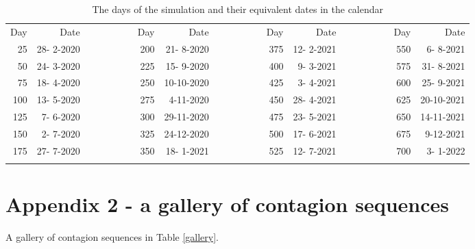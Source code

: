 \documentclass[graybox]{svmult}
\begin{document}
\begin{table}[t]
\begin{center}
\begin{footnotesize}
\begin{tabular}{rrrrrrrrrrr}
\hline\noalign{\smallskip}
 Day & Date &~~~~~~~~& Day & Date &~~~~~~~~& Day & Date &~~~~~~~~& Day & Date \\
 \noalign{\smallskip}\svhline\noalign{\smallskip}
 25 & 28- 2-2020 & & 200 & 21- 8-2020 & & 375 & 12- 2-2021 & & 550 & 6- 8-2021 \\
 50 & 24- 3-2020 & & 225 & 15- 9-2020 & & 400 & 9- 3-2021 & & 575 & 31- 8-2021 \\
 75 & 18- 4-2020 & & 250 & 10-10-2020 & & 425 & 3- 4-2021 & & 600 & 25- 9-2021 \\
100 & 13- 5-2020 & & 275 & 4-11-2020 & & 450 & 28- 4-2021 & & 625 & 20-10-2021 \\
125 & 7- 6-2020 & & 300 & 29-11-2020 & & 475 & 23- 5-2021 & & 650 & 14-11-2021 \\
150 & 2- 7-2020 & & 325 & 24-12-2020 & & 500 & 17- 6-2021 & & 675 & 9-12-2021 \\
175 & 27- 7-2020 & & 350 & 18- 1-2021 & & 525 & 12- 7-2021 & & 700 & 3- 1-2022 \\
\hline\noalign{\smallskip}
\end{tabular}
\end{footnotesize}
\caption{The days of the simulation and their equivalent dates in the calendar}
\label{dates}
\end{center}
\end{table}


\section{Appendix 2 - a gallery of contagion sequences}
\label{app2}

A gallery of contagion sequences in Table \ref{gallery}.
\end{document}
